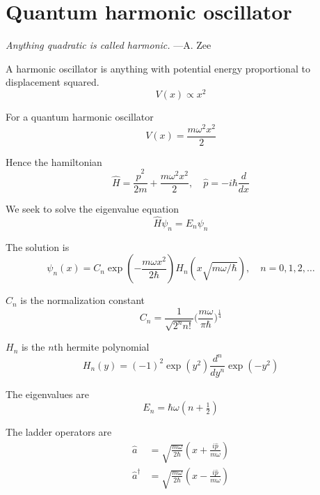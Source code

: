 

\section*{Quantum harmonic oscillator}

{\it Anything quadratic is called harmonic.} ---A. Zee

\bigskip
A harmonic oscillator is anything with potential energy proportional to displacement squared.
\begin{equation*}
V(x)\propto x^2
\end{equation*}

For a quantum harmonic oscillator
\begin{equation*}
V(x)=\frac{m\omega^2 x^2}{2}
\end{equation*}

Hence the hamiltonian
\begin{equation*}
\hat H=\frac{\hat p^2}{2m}+\frac{m\omega^2 x^2}{2},\quad\hat p=-i\hbar\frac{d}{dx}
\end{equation*}

We seek to solve the eigenvalue equation
\begin{equation*}
\hat H\psi_n=E_n\psi_n
\end{equation*}

The solution is
\begin{equation*}
\psi_n(x)=C_n\exp\left(-\frac{m\omega x^2}{2\hbar}\right)
H_n\left(x\sqrt{m\omega/\hbar}\right),\quad n=0,1,2,\ldots
\end{equation*}

$C_n$ is the normalization constant
\begin{equation*}
C_n=\frac{1}{\sqrt{2^nn!}}\biggl(\frac{m\omega}{\pi\hbar}\biggr)^{\frac{1}{4}}
\end{equation*}

$H_n$ is the $n$th hermite polynomial
\begin{equation*}
H_n(y)=(-1)^2\exp\left(y^2\right)\frac{d^n}{dy^n}\exp\left(-y^2\right)
\end{equation*}

The eigenvalues are
\begin{equation*}
E_n=\hbar\omega\left(n+\tfrac{1}{2}\right)
\end{equation*}

The ladder operators are
\begin{align*}
\hat a&=\sqrt{\frac{m\omega}{2\hbar}}\left(x+\frac{i\hat p}{m\omega}\right)
\\[1ex]
\hat a^\dag&=\sqrt{\frac{m\omega}{2\hbar}}\left(x-\frac{i\hat p}{m\omega}\right)
\end{align*}

